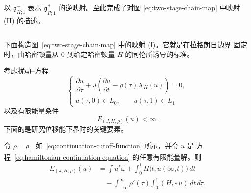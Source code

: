 以 $\mathfrak g_{\widetilde H;1}^-$ 表示
$\mathfrak g_{\widetilde H;1}^+$ 的逆映射。至此完成了对图
\eqref{eq:two-stage-chain-map} 中映射 (II) 的描述。

\subsection{\termDeformationOfHamiltonians{}}
\label{subsec:deformation-of-hamiltonians}

下面构造图~\eqref{eq:two-stage-chain-map} 中的映射 (I)。它就是在拉格朗日边界
固定时，由哈密顿量从 $0$ 到给定哈密顿量 $H$ 的同伦所诱导的标准\termFloerContinuationMap{}。

考虑扰动\personCauchy{}--\personRiemann{}方程
\begin{equation}
  \begin{cases}
    \dfrac{\partial u}{\partial\tau}
    +
    J\left(
      \dfrac{\partial u}{\partial t}
      -
      \rho(\tau)X_H(u)
    \right)=0,\\[6pt]
    u(\tau,0)\in L_0,
    \qquad
    u(\tau,1)\in L_1
  \end{cases}
\label{eq:hamiltonian-continuation-equation}
\end{equation}
以及有限能量条件
\[
  E_{(J,H,\rho)}(u)<\infty.
\]
下面的\termAprioriEnergyBound{}是研究位移能下界时的关键要素。

\begin{lemma}
\label{lem:continuation-energy-identity}
令 $\rho=\rho_+$ 如~\eqref{eq:continuation-cutoff-function} 所示，并令 $u$ 是
方程~\eqref{eq:hamiltonian-continuation-equation} 的任意有限能量解。则
\begin{equation}
  \begin{aligned}
  E_{(J,H,\rho)}(u)
  &=
  \int u^*\omega
  +
  \int_0^1H\bigl(t,u(\infty,t)\bigr)\,dt\\
  &\quad-
  \int_{-\infty}^{\infty}
  \rho'(\tau)
  \int_0^1(H_t\circ u)\,dt\,d\tau.
  \end{aligned}
\label{eq:continuation-energy-identity}
\end{equation}
\end{lemma}

